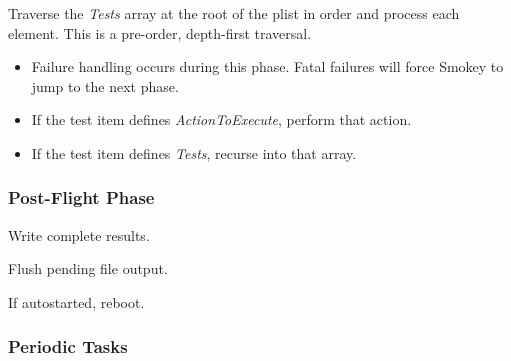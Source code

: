 \documentclass[11pt]{article}
\newcommand{\prop}[1]{{\itshape#1}}
\begin{document}
\begin{Process}[resume]

\item Traverse the \prop{Tests} array at the root of the plist in order and process
	each element.  This is a pre-order, depth-first traversal.

	\begin{itemize}

	\item Failure handling occurs during this phase.  Fatal failures will
		force Smokey to jump to the next phase.

	\item If the test item defines \prop{ActionToExecute}, perform that action.


	\item If the test item defines \prop{Tests}, recurse into that array.

	\end{itemize}

\end{Process}

\subsubsection{Post-Flight Phase}

\begin{Process}[resume]

\item Write complete results.

\item Flush pending file output.

\item If autostarted, reboot.

\end{Process}

\subsubsection{Periodic Tasks}
\end{document}
